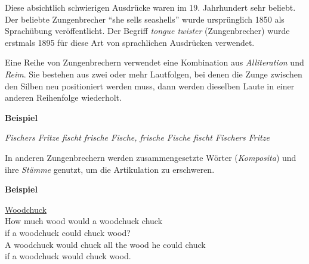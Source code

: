 \documentclass[
  letterpaper,
]{scrbook}
\begin{document}
Diese absichtlich schwierigen Ausdrücke waren im 19. Jahrhundert sehr
beliebt. Der beliebte Zungenbrecher ``she sells seashells'' wurde
ursprünglich 1850 als Sprachübung veröffentlicht. Der Begriff
\emph{tongue twister} (Zungenbrecher) wurde erstmals 1895 für diese Art
von sprachlichen Ausdrücken verwendet.

Eine Reihe von Zungenbrechern verwendet eine Kombination aus
\emph{Alliteration} und \emph{Reim}. Sie bestehen aus zwei oder mehr
Lautfolgen, bei denen die Zunge zwischen den Silben neu positioniert
werden muss, dann werden dieselben Laute in einer anderen Reihenfolge
wiederholt.

\begin{tcolorbox}[enhanced jigsaw, rightrule=.15mm, arc=.35mm, breakable, colframe=quarto-callout-note-color-frame, left=2mm, colback=white, bottomrule=.15mm, toprule=.15mm, leftrule=.75mm, opacityback=0]
\begin{minipage}[t]{5.5mm}
\textcolor{quarto-callout-note-color}{\faInfo}
\end{minipage}%
\begin{minipage}[t]{\textwidth - 5.5mm}

\textbf{Beispiel}\vspace{2mm}

\emph{Fischers Fritze fischt frische Fische, frische Fische fischt
Fischers Fritze}

\end{minipage}%
\end{tcolorbox}

In anderen Zungenbrechern werden zusammengesetzte Wörter
(\emph{Komposita}) und ihre \emph{Stämme} genutzt, um die Artikulation
zu erschweren.

\begin{tcolorbox}[enhanced jigsaw, rightrule=.15mm, arc=.35mm, breakable, colframe=quarto-callout-note-color-frame, left=2mm, colback=white, bottomrule=.15mm, toprule=.15mm, leftrule=.75mm, opacityback=0]
\begin{minipage}[t]{5.5mm}
\textcolor{quarto-callout-note-color}{\faInfo}
\end{minipage}%
\begin{minipage}[t]{\textwidth - 5.5mm}

\textbf{Beispiel}\vspace{2mm}

\href{https://en.wikipedia.org/wiki/How_much_wood_would_a_woodchuck_chuck}{Woodchuck}\\
How much wood would a woodchuck chuck\\
if a woodchuck could chuck wood?\\
A woodchuck would chuck all the wood he could chuck\\
if a woodchuck would chuck wood.\\

\end{minipage}%
\end{tcolorbox}
\end{document}
